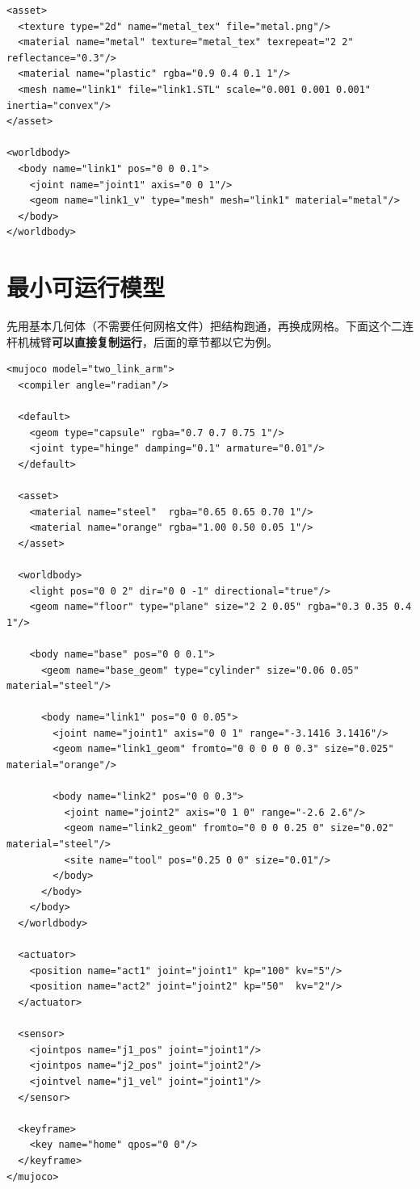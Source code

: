 \begin{lstlisting}[style=xml]
<asset>
  <texture type="2d" name="metal_tex" file="metal.png"/>
  <material name="metal" texture="metal_tex" texrepeat="2 2" reflectance="0.3"/>
  <material name="plastic" rgba="0.9 0.4 0.1 1"/>
  <mesh name="link1" file="link1.STL" scale="0.001 0.001 0.001" inertia="convex"/>
</asset>

<worldbody>
  <body name="link1" pos="0 0 0.1">
    <joint name="joint1" axis="0 0 1"/>
    <geom name="link1_v" type="mesh" mesh="link1" material="metal"/>
  </body>
</worldbody>
\end{lstlisting}

\section{最小可运行模型}

先用基本几何体（不需要任何网格文件）把结构跑通，再换成网格。下面这个二连杆机械臂\textbf{可以直接复制运行}，后面的章节都以它为例。

\begin{lstlisting}[style=xml]
<mujoco model="two_link_arm">
  <compiler angle="radian"/>

  <default>
    <geom type="capsule" rgba="0.7 0.7 0.75 1"/>
    <joint type="hinge" damping="0.1" armature="0.01"/>
  </default>

  <asset>
    <material name="steel"  rgba="0.65 0.65 0.70 1"/>
    <material name="orange" rgba="1.00 0.50 0.05 1"/>
  </asset>

  <worldbody>
    <light pos="0 0 2" dir="0 0 -1" directional="true"/>
    <geom name="floor" type="plane" size="2 2 0.05" rgba="0.3 0.35 0.4 1"/>

    <body name="base" pos="0 0 0.1">
      <geom name="base_geom" type="cylinder" size="0.06 0.05" material="steel"/>

      <body name="link1" pos="0 0 0.05">
        <joint name="joint1" axis="0 0 1" range="-3.1416 3.1416"/>
        <geom name="link1_geom" fromto="0 0 0 0 0 0.3" size="0.025" material="orange"/>

        <body name="link2" pos="0 0 0.3">
          <joint name="joint2" axis="0 1 0" range="-2.6 2.6"/>
          <geom name="link2_geom" fromto="0 0 0 0.25 0" size="0.02" material="steel"/>
          <site name="tool" pos="0.25 0 0" size="0.01"/>
        </body>
      </body>
    </body>
  </worldbody>

  <actuator>
    <position name="act1" joint="joint1" kp="100" kv="5"/>
    <position name="act2" joint="joint2" kp="50"  kv="2"/>
  </actuator>

  <sensor>
    <jointpos name="j1_pos" joint="joint1"/>
    <jointpos name="j2_pos" joint="joint2"/>
    <jointvel name="j1_vel" joint="joint1"/>
  </sensor>

  <keyframe>
    <key name="home" qpos="0 0"/>
  </keyframe>
</mujoco>
\end{lstlisting}

